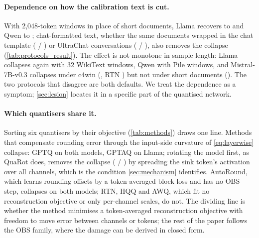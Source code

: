\paragraph{Dependence on how the calibration text is cut.}
With 2,048-token windows in place of short documents, Llama recovers to \LcwinIF{} and Qwen to \QcwinIF{}; chat-formatted text, whether the same documents wrapped in the chat template (\LcchatIF{} / \QcchatIF{}) or UltraChat conversations \citep{ding2023ultrachat} (\LuchatIF{} / \QuchatIF{}), also removes the collapse (\cref{tab:protocols_result}).
The effect is not monotone in sample length: Llama collapses again with 32 WikiText windows, Qwen with Pile windows, and Mistral-7B-v0.3 collapses under c4win (\MgptqIF{}, RTN \MrtnIF{}) but not under short documents (\MshortIF{}).
The two protocols that disagree are both defaults.
We treat the dependence as a symptom; \cref{sec:lesion} locates it in a specific part of the quantised network.

\paragraph{Which quantisers share it.}
Sorting six quantisers by their objective (\cref{tab:methods}) draws one line.
Methods that compensate rounding error through the input-side curvature of \cref{eq:layerwise} collapse: GPTQ on both models, GPTAQ on Llama; rotating the model first, as QuaRot does, removes the collapse (\LrotIF{} / \QrotIF{}) by spreading the sink token's activation over all channels, which is the condition \cref{sec:mechanism} identifies.
AutoRound, which learns rounding offsets by a token-averaged block loss and has no OBS step, collapses on both models; RTN, HQQ \citep{badri2023hqq} and AWQ, which fit no reconstruction objective or only per-channel scales, do not.
The dividing line is whether the method minimises a token-averaged reconstruction objective with freedom to move error between channels or tokens; the rest of the paper follows the OBS family, where the damage can be derived in closed form.
